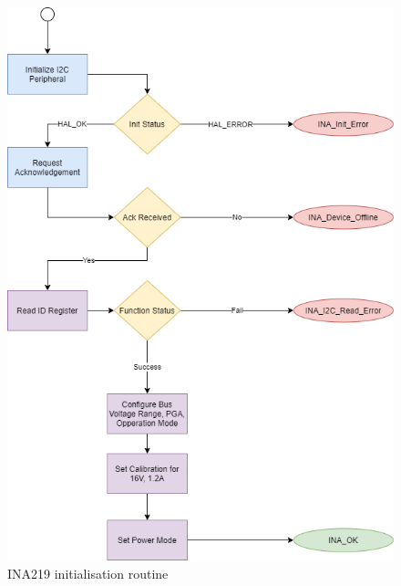 \begin{figure}[H]
    \centering
    \includegraphics[scale=0.3]{INA219 Init routine.png}
    \caption{INA219 initialisation routine}
    \label{fig:Init_diagram_ina}
\end{figure}

